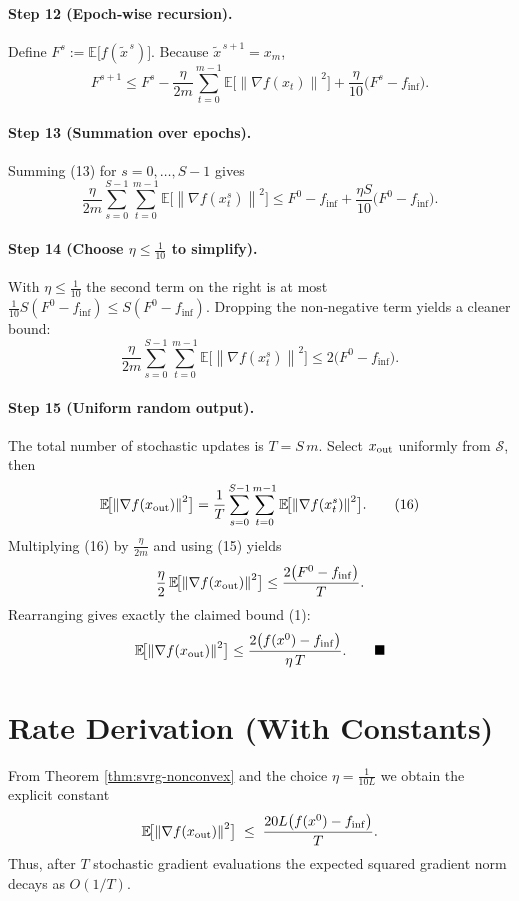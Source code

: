 \documentclass[11pt]{article}
\newcommand{\E}{\mathbb{E}}
\newcommand{\norm}[1]{\left\|#1\right\|}
\begin{document}
\paragraph{Step 12 (Epoch‑wise recursion).}
Define $F^{s}:= \E\!\bigl[f(\tilde{x}^{\,s})\bigr]$.
Because $\tilde{x}^{\,s+1}=x_m$,
\[
F^{s+1}\le F^{s}
-\frac{\eta}{2m}\sum_{t=0}^{m-1}\E\!\bigl[\norm{\nabla f(x_t)}^{2}\bigr]
+\frac{\eta}{10}\bigl(F^{s}-f_{\inf}\bigr).
\tag{13}
\]

\paragraph{Step 13 (Summation over epochs).}
Summing (13) for $s=0,\dots,S-1$ gives
\[
\frac{\eta}{2m}\sum_{s=0}^{S-1}\sum_{t=0}^{m-1}
\E\!\bigl[\norm{\nabla f(x_t^{s})}^{2}\bigr]
\le F^{0}-f_{\inf}
+\frac{\eta S}{10}\bigl(F^{0}-f_{\inf}\bigr).
\tag{14}
\]

\paragraph{Step 14 (Choose $\eta\le\frac{1}{10}$ to simplify).}
With $\eta\le\frac{1}{10}$ the second term on the right is at most $\frac{1}{10}S(F^{0}-f_{\inf})\le S(F^{0}-f_{\inf})$.
Dropping the non‑negative term yields a cleaner bound:
\[
\frac{\eta}{2m}\sum_{s=0}^{S-1}\sum_{t=0}^{m-1}
\E\!\bigl[\norm{\nabla f(x_t^{s})}^{2}\bigr]
\le 2\bigl(F^{0}-f_{\inf}\bigr).
\tag{15}
\]

\paragraph{Step 15 (Uniform random output).}
The total number of stochastic updates is $T=S\,m$.
Select $x_{\rm out}$ uniformly from $\mathcal{S}$, then
\[
\E\!\bigl[\norm{\nabla f(x_{\rm out})}^{2}\bigr]
=
\frac{1}{T}\sum_{s=0}^{S-1}\sum_{t=0}^{m-1}
\E\!\bigl[\norm{\nabla f(x_t^{s})}^{2}\bigr].
\tag{16}
\]
Multiplying (16) by $\frac{\eta}{2m}$ and using (15) yields
\[
\frac{\eta}{2}\,\E\!\bigl[\norm{\nabla f(x_{\rm out})}^{2}\bigr]
\le
\frac{2\bigl(F^{0}-f_{\inf}\bigr)}{T}.
\]
Rearranging gives exactly the claimed bound (1):
\[
\E\!\bigl[\norm{\nabla f(x_{\rm out})}^{2}\bigr]
\le
\frac{2\bigl(f(x^{0})-f_{\inf}\bigr)}{\eta\,T}.
\qquad\blacksquare
\]

\section*{Rate Derivation (With Constants)}
From Theorem \ref{thm:svrg-nonconvex} and the choice $\eta=\frac{1}{10L}$ we obtain the explicit constant
\[
\E\!\bigl[\norm{\nabla f(x_{\rm out})}^{2}\bigr]
\;\le\;
\frac{20L\bigl(f(x^{0})-f_{\inf}\bigr)}{T}.
\]
Thus, after $T$ stochastic gradient evaluations the expected squared gradient norm decays as $O(1/T)$.
\end{document}
